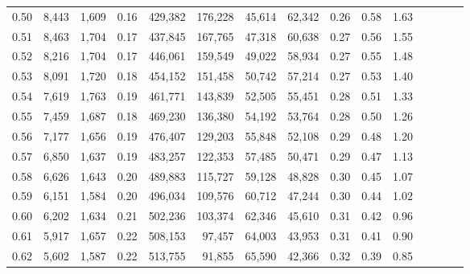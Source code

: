\begin{tabular}{rrrcrrrrrrrrrrr}
0.50 &   8,443 &  1,609 &                                       0.16 &  429,382 &  176,228 &   45,614 &   62,342 &  0.26 &  0.58 &                         1.63 \\
0.51 &   8,463 &  1,704 &                                       0.17 &  437,845 &  167,765 &   47,318 &   60,638 &  0.27 &  0.56 &                         1.55 \\
0.52 &   8,216 &  1,704 &                                       0.17 &  446,061 &  159,549 &   49,022 &   58,934 &  0.27 &  0.55 &                         1.48 \\
0.53 &   8,091 &  1,720 &                                       0.18 &  454,152 &  151,458 &   50,742 &   57,214 &  0.27 &  0.53 &                         1.40 \\
0.54 &   7,619 &  1,763 &                                       0.19 &  461,771 &  143,839 &   52,505 &   55,451 &  0.28 &  0.51 &                         1.33 \\
0.55 &   7,459 &  1,687 &                                       0.18 &  469,230 &  136,380 &   54,192 &   53,764 &  0.28 &  0.50 &                         1.26 \\
0.56 &   7,177 &  1,656 &                                       0.19 &  476,407 &  129,203 &   55,848 &   52,108 &  0.29 &  0.48 &                         1.20 \\
0.57 &   6,850 &  1,637 &                                       0.19 &  483,257 &  122,353 &   57,485 &   50,471 &  0.29 &  0.47 &                         1.13 \\
0.58 &   6,626 &  1,643 &                                       0.20 &  489,883 &  115,727 &   59,128 &   48,828 &  0.30 &  0.45 &                         1.07 \\
0.59 &   6,151 &  1,584 &                                       0.20 &  496,034 &  109,576 &   60,712 &   47,244 &  0.30 &  0.44 &                         1.02 \\
0.60 &   6,202 &  1,634 &                                       0.21 &  502,236 &  103,374 &   62,346 &   45,610 &  0.31 &  0.42 &                         0.96 \\
0.61 &   5,917 &  1,657 &                                       0.22 &  508,153 &   97,457 &   64,003 &   43,953 &  0.31 &  0.41 &                         0.90 \\
0.62 &   5,602 &  1,587 &                                       0.22 &  513,755 &   91,855 &   65,590 &   42,366 &  0.32 &  0.39 &                         0.85 \\

\end{tabular}
